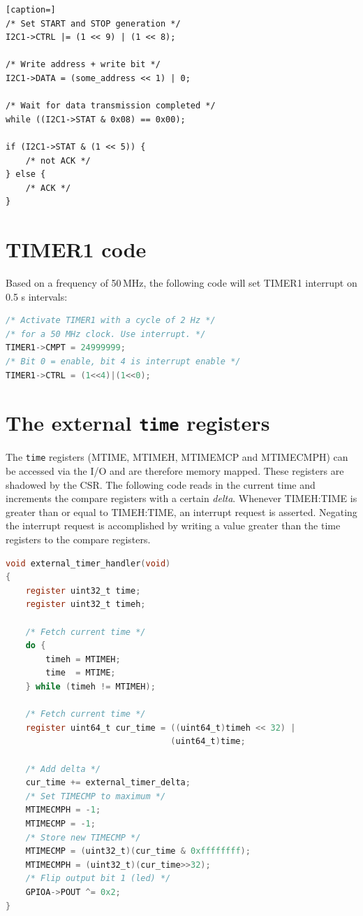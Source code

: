 \documentclass[12pt]{article}
\begin{document}
\begin{lstlisting}[caption=]
/* Set START and STOP generation */
I2C1->CTRL |= (1 << 9) | (1 << 8);

/* Write address + write bit */
I2C1->DATA = (some_address << 1) | 0;

/* Wait for data transmission completed */
while ((I2C1->STAT & 0x08) == 0x00);

if (I2C1->STAT & (1 << 5)) {
    /* not ACK */
} else {
    /* ACK */
}
\end{lstlisting} 


\section{TIMER1 code}
Based on a frequency of 50$\,$MHz, the following code will set TIMER1 interrupt on 0.5 s intervals:

\begin{lstlisting}[language=C]
/* Activate TIMER1 with a cycle of 2 Hz */
/* for a 50 MHz clock. Use interrupt. */
TIMER1->CMPT = 24999999;
/* Bit 0 = enable, bit 4 is interrupt enable */
TIMER1->CTRL = (1<<4)|(1<<0);
\end{lstlisting}

\section{The external \texttt{time} registers}
The \lstinline|time| registers (MTIME, MTIMEH, MTIMEMCP and MTIMECMPH) can be accessed via the I/O and are therefore memory mapped. These registers are shadowed by the CSR. The following code reads in the current time and increments the compare registers with a certain \emph{delta}. Whenever TIMEH:TIME is greater than or equal to TIMEH:TIME, an interrupt request is asserted. Negating the interrupt request is accomplished by writing a value greater than the time registers to the compare registers.

\begin{lstlisting}[language=C]
void external_timer_handler(void)
{
    register uint32_t time;
    register uint32_t timeh;

    /* Fetch current time */
    do {
        timeh = MTIMEH;
        time  = MTIME;
    } while (timeh != MTIMEH);

    /* Fetch current time */
    register uint64_t cur_time = ((uint64_t)timeh << 32) |
                                 (uint64_t)time;

    /* Add delta */
    cur_time += external_timer_delta;
    /* Set TIMECMP to maximum */
    MTIMECMPH = -1;
    MTIMECMP = -1;
    /* Store new TIMECMP */
    MTIMECMP = (uint32_t)(cur_time & 0xffffffff);
    MTIMECMPH = (uint32_t)(cur_time>>32);
    /* Flip output bit 1 (led) */
    GPIOA->POUT ^= 0x2;
}
\end{lstlisting}
\end{document}
